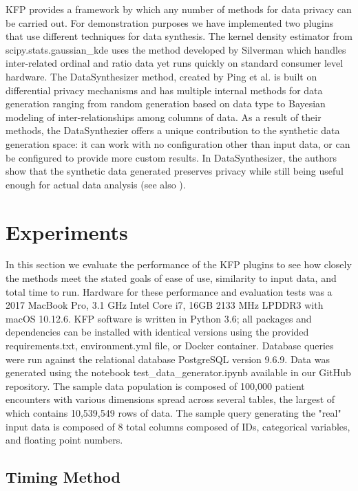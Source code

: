 \documentclass{amia}
\begin{document}
KFP provides a framework by which any number of methods for data privacy can be carried out. For demonstration purposes we have implemented two plugins that use different techniques for data synthesis. The kernel density estimator from scipy.stats.gaussian\_kde uses the method developed by Silverman \cite{silverman_density_1986} which handles inter-related ordinal and ratio data yet runs quickly on standard consumer level hardware. The DataSynthesizer method, created by Ping et al. \cite{ping17datasynthesizer} is built on differential privacy mechanisms and has multiple internal methods for data generation ranging from random generation based on data type to Bayesian modeling of inter-relationships among columns of data. As a result of their methods, the DataSynthezier offers a unique contribution to the synthetic data generation space: it can work with no configuration other than input data, or can be configured to provide more custom results. In DataSynthesizer, the authors show that the synthetic data generated preserves privacy while still being useful enough for actual data analysis (see also \cite{howe_synthetic_2017}).

\section{Experiments}

In this section we evaluate the performance of the KFP plugins to see how closely the methods meet the stated goals of ease of use, similarity to input data, and total time to run. Hardware for these performance and evaluation tests was a 2017 MacBook Pro, 3.1 GHz Intel Core i7, 16GB 2133 MHz LPDDR3 with macOS 10.12.6. KFP software is written in Python 3.6; all packages and dependencies can be installed with identical versions using the provided requirements.txt, environment.yml file, or Docker container. Database queries were run against the relational database PostgreSQL version 9.6.9. Data was generated using the notebook test\_data\_generator.ipynb available in our GitHub repository. The sample data population is composed of 100,000 patient encounters with various dimensions spread across several tables, the largest of which contains 10,539,549 rows of data. The sample query generating the "real" input data is composed of 8 total columns composed of IDs, categorical variables, and floating point numbers.

\subsection{Timing Method}
\end{document}
